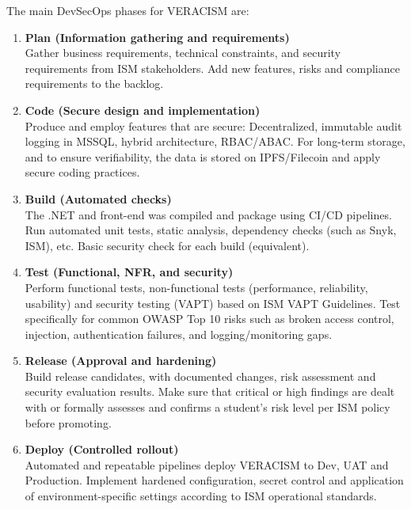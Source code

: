The main DevSecOps phases for VERACISM are:

\begin{enumerate}
    \item \textbf{Plan (Information gathering and requirements)} \\
    Gather business requirements, technical constraints, and security requirements from ISM
    stakeholders. Add new features, risks and compliance requirements to the backlog.

    \item \textbf{Code (Secure design and implementation)} \\
    Produce and employ features that are secure:
    Decentralized, immutable audit logging in MSSQL, hybrid architecture, RBAC/ABAC.
    For long-term storage, and to ensure verifiability, the data is stored on IPFS/Filecoin and apply secure coding practices.

    \item \textbf{Build (Automated checks)} \\
    The .NET and front-end was compiled and package using CI/CD pipelines. Run automated unit tests, static analysis, dependency checks (such as Snyk, ISM), etc.
    Basic security check for each build (equivalent).

    \item \textbf{Test (Functional, NFR, and security)} \\
    Perform functional tests, non-functional tests (performance, reliability, usability)
    and security testing (VAPT) based on ISM VAPT Guidelines. Test
    specifically for common OWASP Top 10 risks such as broken access control, injection,
    authentication failures, and logging/monitoring gaps.

    \item \textbf{Release (Approval and hardening)} \\
    Build release candidates, with documented changes, risk assessment and security evaluation
    results. Make sure that critical or high findings are dealt with or formally
    assesses and confirms a student's risk level per ISM policy before promoting.

    \item \textbf{Deploy (Controlled rollout)} \\
    Automated and repeatable pipelines deploy VERACISM to Dev, UAT and Production. Implement hardened configuration, secret control and application of environment-specific settings according to ISM operational standards.


\end{enumerate}
